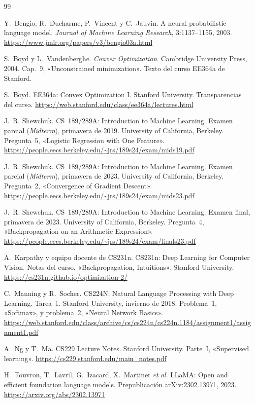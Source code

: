 \begin{thebibliography}{99}
\small

Y.~Bengio, R.~Ducharme, P.~Vincent y C.~Jauvin.
\newblock A neural probabilistic language model.
\newblock \emph{Journal of Machine Learning Research}, 3:1137--1155, 2003.
\newblock \url{https://www.jmlr.org/papers/v3/bengio03a.html}

S.~Boyd y L.~Vandenberghe.
\newblock \emph{Convex Optimization}.
\newblock Cambridge University Press, 2004.
\newblock Cap.~9, «Unconstrained minimization». Texto del curso EE364a de Stanford.

S.~Boyd.
\newblock EE364a: Convex Optimization I.
\newblock Stanford University. Transparencias del curso.
\newblock \url{https://web.stanford.edu/class/ee364a/lectures.html}

J.~R. Shewchuk.
\newblock CS~189/289A: Introduction to Machine Learning. Examen parcial (\emph{Midterm}), primavera de 2019.
\newblock University of California, Berkeley. Pregunta~5, «Logistic Regression with One Feature».
\newblock \url{https://people.eecs.berkeley.edu/~jrs/189s24/exam/mids19.pdf}

J.~R. Shewchuk.
\newblock CS~189/289A: Introduction to Machine Learning. Examen parcial (\emph{Midterm}), primavera de 2023.
\newblock University of California, Berkeley. Pregunta~2, «Convergence of Gradient Descent».
\newblock \url{https://people.eecs.berkeley.edu/~jrs/189s24/exam/mids23.pdf}

J.~R. Shewchuk.
\newblock CS~189/289A: Introduction to Machine Learning. Examen final, primavera de 2023.
\newblock University of California, Berkeley. Pregunta~4, «Backpropagation on an Arithmetic Expression».
\newblock \url{https://people.eecs.berkeley.edu/~jrs/189s24/exam/finals23.pdf}

A.~Karpathy y equipo docente de CS231n.
\newblock CS231n: Deep Learning for Computer Vision. Notas del curso, «Backpropagation, Intuitions».
\newblock Stanford University.
\newblock \url{https://cs231n.github.io/optimization-2/}

C.~Manning y R.~Socher.
\newblock CS224N: Natural Language Processing with Deep Learning. Tarea~1.
\newblock Stanford University, invierno de 2018. Problema~1, «Softmax», y problema~2, «Neural Network Basics».
\newblock \url{https://web.stanford.edu/class/archive/cs/cs224n/cs224n.1184/assignment1/assignment1.pdf}

A.~Ng y T.~Ma.
\newblock CS229 Lecture Notes.
\newblock Stanford University. Parte~I, «Supervised learning».
\newblock \url{https://cs229.stanford.edu/main_notes.pdf}

H.~Touvron, T.~Lavril, G.~Izacard, X.~Martinet \emph{et al.}
\newblock LLaMA: Open and efficient foundation language models.
\newblock Prepublicación arXiv:2302.13971, 2023.
\newblock \url{https://arxiv.org/abs/2302.13971}

\end{thebibliography}
